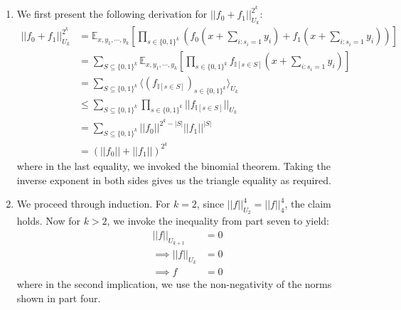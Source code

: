 \documentclass[12pt]{article}%
\newcommand{\Exp}[1]{\mathbb{E}_{#1}}
\begin{document}
\begin{enumerate}
  \item
  We first present the following derivation for $||f_0 + f_1||_{U_k}^{2^k}$:
  \begin{align*}
    ||f_0 + f_1||_{U_k}^{2^k} & = \Exp{x, y_1, \cdots, y_k} \left[ \prod_{s \in \{0,1\}^k} \left(f_0(x + \sum_{i: s_i = 1} y_i)+ f_1(x + \sum_{i: s_i = 1} y_i)\right)\right] \\
    & = \sum_{S \subseteq \{0,1\}^k} \Exp{x, y_1, \cdots, y_k} \left[ \prod_{s \in \{0,1\}^k} f_{\mathbb{I}[s \in S]}(x + \sum_{i: s_i = 1} y_i)\right] \\
    & = \sum_{S \subseteq \{0,1\}^k} \langle (f_{\mathbb{I}[s \in S]})_{s \in \{0,1\}^k} \rangle_{U_k} \\
    & \leq \sum_{S \subseteq \{0,1\}^k} \prod_{s \in \{0,1\}^k}||f_{\mathbb{I}[s \in S]}||_{U_k} \\
    & = \sum_{S \subseteq \{0,1\}^k} ||f_0||^{2^k - |S|} ||f_1||^{|S|} \\
    & = (||f_0|| + ||f_1||)^{2^k}
  \end{align*}
  where in the last equality, we invoked the binomial theorem. Taking the inverse exponent in both sides gives us the triangle equality as required.

  \item
  We proceed through induction. For $k=2$, since $||f||_{U_2}^4 = ||f||_4^4$, the claim holds. Now for $k > 2$, we invoke the inequality from part seven to yield:
  \begin{align*}
    ||f||_{U_{k+1}} & = 0 \\
    \implies  ||f||_{U_k}  & = 0 \\
    \implies f & = 0
  \end{align*}
  where in the second implication, we use the non-negativity of the norms shown in part four.
\end{enumerate}
\end{document}
